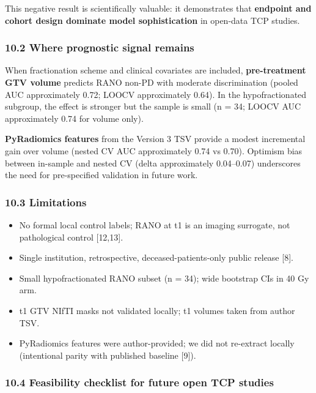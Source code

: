 \documentclass[
  11pt,
]{article}
\providecommand{\tightlist}{%
  \setlength{\itemsep}{0pt}\setlength{\parskip}{0pt}}
\begin{document}
This negative result is scientifically valuable: it demonstrates that
\textbf{endpoint and cohort design dominate model sophistication} in
open-data TCP studies.

\subsubsection{10.2 Where prognostic signal
remains}\label{where-prognostic-signal-remains}

When fractionation scheme and clinical covariates are included,
\textbf{pre-treatment GTV volume} predicts RANO non-PD with moderate
discrimination (pooled AUC approximately 0.72; LOOCV approximately
0.64). In the hypofractionated subgroup, the effect is stronger but the
sample is small (n = 34; LOOCV AUC approximately 0.74 for volume only).

\textbf{PyRadiomics features} from the Version 3 TSV provide a modest
incremental gain over volume (nested CV AUC approximately 0.74 vs 0.70).
Optimism bias between in-sample and nested CV (delta approximately
0.04--0.07) underscores the need for pre-specified validation in future
work.

\subsubsection{10.3 Limitations}\label{limitations}

\begin{itemize}
\tightlist
\item
  No formal local control labels; RANO at t1 is an imaging surrogate,
  not pathological control {[}12,13{]}.
\item
  Single institution, retrospective, deceased-patients-only public
  release {[}8{]}.
\item
  Small hypofractionated RANO subset (n = 34); wide bootstrap CIs in 40
  Gy arm.
\item
  t1 GTV NIfTI masks not validated locally; t1 volumes taken from author
  TSV.
\item
  PyRadiomics features were author-provided; we did not re-extract
  locally (intentional parity with published baseline {[}9{]}).
\end{itemize}

\subsubsection{10.4 Feasibility checklist for future open TCP
studies}\label{feasibility-checklist-for-future-open-tcp-studies}
\end{document}
